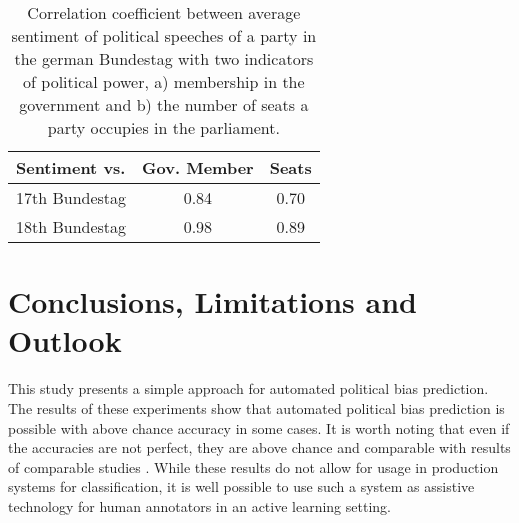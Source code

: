 \documentclass[11pt]{article}
\begin{document}
\begin{table}[t]
\caption{
\label{tab:sentiments}
Correlation coefficient between average sentiment of political speeches of a party in the german Bundestag with two indicators of political power, a) membership in the government and b) the number of seats a party occupies in the parliament.
}
\begin{center}
\begin{tabular}{lcc}
   Sentiment vs. &          Gov. Member    &  Seats\\
\hline\hline
17th Bundestag    &  0.84 & 0.70\\
18th Bundestag   &  0.98 & 0.89\\
%
\end{tabular}
\end{center}
\end{table}






\section{Conclusions, Limitations and Outlook}\label{sec:conclusion}
This study presents a simple approach for automated political bias prediction. The results of these experiments show that automated political bias prediction is possible with above chance accuracy in some cases. It is worth noting that even if the accuracies are not perfect, they are above chance and comparable with results of comparable studies \cite{Yu2008, Hirst2014}. While these results do not allow for usage in production systems for classification, it is well possible to use such a system as assistive technology for human annotators in an active learning setting.
\end{document}
